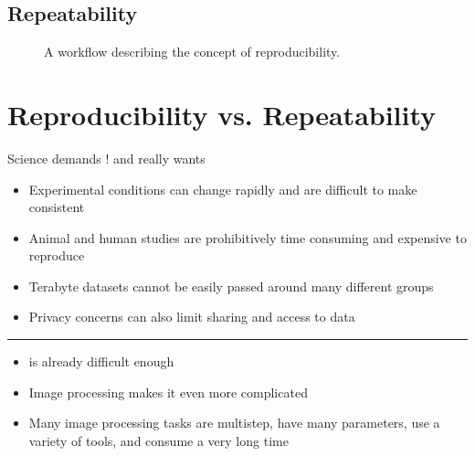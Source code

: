 \documentclass[letterpaper,10pt,english]{sphinxmanual}
\begin{document}
\subsection{Repeatability}
\label{\detokenize{01-Introduction:repeatability}}
\begin{figure}[htbp]
\centering
\capstart

\noindent{}
\caption{A workflow describing the concept of reproducibility.}\label{\detokenize{01-Introduction:id11}}\end{figure}




\section{Reproducibility vs. Repeatability}
\label{\detokenize{01-Introduction:id5}}
\sphinxAtStartPar
Science demands ! and really wants 
\begin{itemize}
\item {} 
\sphinxAtStartPar
Experimental conditions can change rapidly and are difficult to make consistent

\item {} 
\sphinxAtStartPar
Animal and human studies are prohibitively time consuming and expensive to reproduce

\item {} 
\sphinxAtStartPar
Terabyte datasets cannot be easily passed around many different groups

\item {} 
\sphinxAtStartPar
Privacy concerns can also limit sharing and access to data

\end{itemize}


\bigskip\hrule\bigskip

\begin{itemize}
\item {} 
\sphinxAtStartPar
{} is already difficult enough

\item {} 
\sphinxAtStartPar
Image processing makes it even more complicated

\item {} 
\sphinxAtStartPar
Many image processing tasks are multistep, have many parameters, use a variety of tools, and consume a very long time

\end{itemize}
\end{document}
